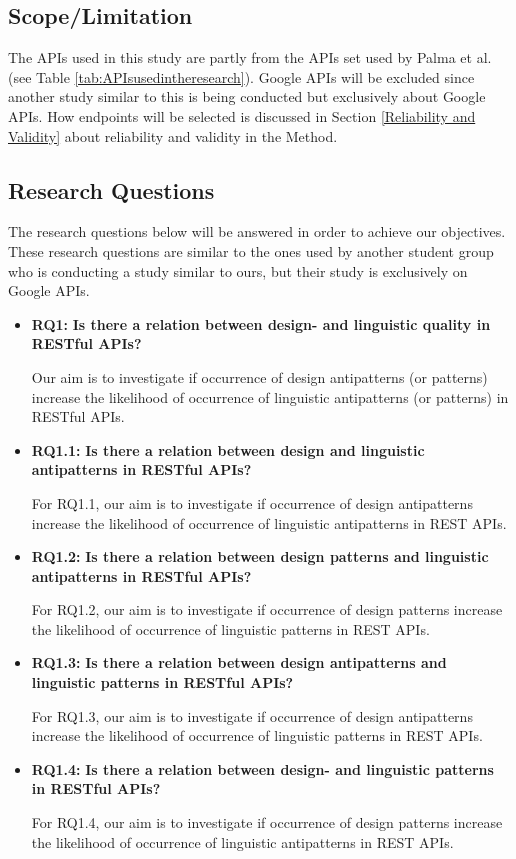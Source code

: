 \subsection{Scope/Limitation}
The APIs used in this study are partly from the APIs set used by Palma et al. \cite{linguistic} (see Table \ref{tab:APIsusedintheresearch}). Google APIs will be excluded since another study similar to this is being conducted but exclusively about Google APIs. How endpoints will be selected is discussed in Section \ref{Reliability and Validity} about reliability and validity in the Method.


\subsection{Research Questions}
The research questions below will be answered in order to achieve our objectives. These research questions are similar to the ones used by another student group who is conducting a study similar to ours, but their study is exclusively on Google APIs. 

\begin{itemize}
\item \textbf{RQ1:} \textbf{Is there a relation between design- and linguistic quality in RESTful APIs?}

Our aim is to investigate if occurrence of design antipatterns (or patterns) increase the likelihood of occurrence of linguistic antipatterns (or patterns) in RESTful APIs.


\item \textbf{RQ1.1:} \textbf{Is there a relation between design and linguistic antipatterns in RESTful APIs?}

For RQ1.1, our aim is to investigate if occurrence of design antipatterns increase the likelihood of occurrence of linguistic antipatterns in REST APIs.

\item \textbf{RQ1.2:} \textbf{Is there a relation between design patterns and linguistic antipatterns in RESTful APIs?}

For RQ1.2, our aim is to investigate if occurrence of design patterns increase the likelihood of occurrence of linguistic patterns in REST APIs. 

\item  \textbf{RQ1.3:} \textbf{Is there a relation between design antipatterns and linguistic patterns in RESTful APIs?}

For RQ1.3, our aim is to investigate if occurrence of design antipatterns increase the likelihood of occurrence of linguistic patterns in REST APIs.

\item  \textbf{RQ1.4:} \textbf{Is there a relation between design- and linguistic patterns in RESTful APIs?}

For RQ1.4, our aim is to investigate if occurrence of design patterns increase the likelihood of occurrence of linguistic antipatterns in REST APIs. 

\end{itemize}


